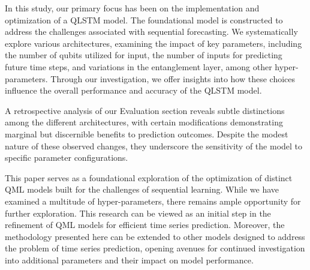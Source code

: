 In this study, our primary focus has been on the implementation and optimization of a QLSTM model. The foundational model is constructed to address the challenges associated with sequential forecasting. We systematically explore various architectures, examining the impact of key parameters, including the number of qubits utilized for input, the number of inputs for predicting future time steps, and variations in the entanglement layer, among other hyper-parameters. Through our investigation, we offer insights into how these choices influence the overall performance and accuracy of the QLSTM model.

A retrospective analysis of our Evaluation section reveals subtle distinctions among the different architectures, with certain modifications demonstrating marginal but discernible benefits to prediction outcomes. Despite the modest nature of these observed changes, they underscore the sensitivity of the model to specific parameter configurations.
	
This paper serves as a foundational exploration of the optimization of distinct QML models built for the challenges of sequential learning. While we have examined a multitude of hyper-parameters, there remains ample opportunity for further exploration. This research can be viewed as an initial step in the refinement of QML models for efficient time series prediction. Moreover, the methodology presented here can be extended to other models designed to address the problem of time series prediction, opening avenues for continued investigation into additional parameters and their impact on model performance.